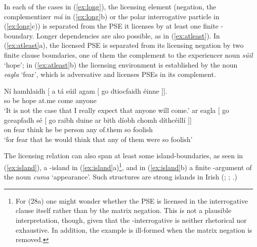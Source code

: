 \documentclass[output=paper,colorlinks,citecolor=brown]{langscibook}
\begin{document}
\noindent In each of the cases in (\ref{ex:long}), the licensing element (negation, the complementizer \textit{má} in (\ref{ex:long}b) or the polar interrogative particle in (\ref{ex:long}c)) is separated from the PSE it licenses by at least one finite \CP-boundary. Longer dependencies are also possible, as in (\ref{ex:atleast}). In (\ref{ex:atleast}a), the licensed PSE is separated from its licensing negation by two finite clause boundaries, one of them the complement to the experiencer noun \textit{súil} `hope'; in (\ref{ex:atleast}b) the licensing environment is established by the noun \textit{eagla} `fear', which is adversative and licenses PSEs in its complement.

\ea\label{ex:atleast}
\ea
\gll Ní hamhlaidh {[\lbCP} a tá súil agam {[\lbCP} go dtiocfaidh éinne {]]}. \\
    {\negcop} so {} {\go} {be\pres} hope at.me {} {\go} {come\fut} anyone\\
\glt `It is not the case that I really expect that anyone will come.'
\ex
\gll ar eagla {[\lbCP} go gceapfadh sé {[\lbCP} go raibh duine {ar bith} díobh chomh díthcéillí {]]} \\
    on fear {} {\go} {think\cond} he {} {\go} {be\past} person any of.them so foolish \\
\glt `for fear that he would think that any of them were so foolish'
\z
\z


The licensing relation can also span at least some island-boundaries, as seen in (\ref{ex:island}), a \WH-island in (\ref{ex:island}a)\footnote{For (28a) one might wonder whether the PSE is   licensed in the interrogative clause itself rather than by the matrix negation. This is not a   plausible interpretation, though, given that the \WH-interrogative is neither rhetorical nor exhaustive. In addition, the example is ill-formed when the matrix negation is removed.},  and in (\ref{ex:island}b) a finite \CP-argument of the noun {\itshape cuma} `appearance'.  Such structures are strong islands in Irish (\cite{mccloskey:85}; \cite{mccloskey:02}; \cite{maki-obaoill:11}.)
\end{document}
